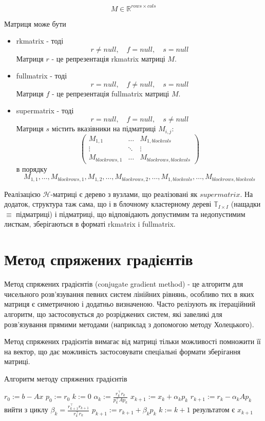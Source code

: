 \documentclass[12pt]{report}
\begin{document}
	$$M\in\mathbb{R}^{rows\times cols}$$
	\par Матриця може бути 
	\begin{itemize}
		\item rkmatrix - тоді 
		$$r\not=null,\quad
		f=null,\quad
		s=null$$
		Матриця $r$ - це репрезентація rkmatrix матриці $M$.
		\item fullmatrix - тоді  
		$$r=null,\quad
		f\not=null,\quad
		s=null$$
		Матриця $f$ - це репрезентація fullmatrix матриці $M$.
		\item supermatrix - тоді
		$$r=null,\quad
		f=null,\quad
		s\not=null$$
		Матриця $s$ містить вказівники на підматриці $M_{i,j}$:
		\[
			\begin{pmatrix}
				M_{1,1} & \dots & M_{1,blockcols}\\
				\vdots & \ddots & \vdots \\
				M_{blockrows,1} &\dots  & M_{blockrows,blockcols}
			\end{pmatrix}
		\]
		в порядку 
		$$M_{1,1},\dots,M_{blockrows,1},M_{1,2},\dots,M_{blockrows,2},\dots,M_{1,blockcols},\dots,M_{blockrows,blockcols}$$
	\end{itemize}
	\par Реалізацією $\mathcal{H}$-матриці є дерево з вузлами, що реалізовані як $supermatrix$. На додаток, структура таж сама, що і в блочному кластерному дереві $\mathbb{T}_{I\times I}$ (нащадки $\equiv$ підматриці) і підматриці, що відповідають допустимим та недопустимим листкам, зберігаються в форматі rkmatrix i fullmatrix.
	\section{Метод спряжених градієнтів}
	\par Метод спряжених градієнтів (conjugate gradient method) - це алгоритм для чисельного розв'язування певних систем лінійних рівнянь, особливо тих в яких матриця є симетричною і додатньо визначеною. Часто релізують як ітераційний алгоритм, що застосовується до розріджених систем, які завеликі для розв'язування прямими методами (наприклад з допомогою методу Холецького).
	\par Метод спряжених градієнтів вимагає від матриці тільки можливості помножити її на вектор, що дає можливість застосовувати спеціальні формати зберігання матриці.
	\begin{algorithm}
	\caption{Алгоритм методу спряжених градієнтів}
	\begin{algorithmic}
		\STATE $r_0:=b-Ax$
		\STATE $p_0:=r_0$
		\STATE $k:=0$
			\STATE $\alpha_k:=\frac{r_k^{\intercal}r_k}{p_k^{\intercal}Ap_k}$
			\STATE $x_{k+1}:=x_k+\alpha_kp_k$
			\STATE $r_{k+1}:=r_k-\alpha_kAp_k$
				\STATE вийти з циклу
			\ENDIF
			\STATE $\beta_k=\frac{r_{k+1}^{\intercal}r_{k+1}}{r_k^\intercal r_k}$
			\STATE $p_{k+1}:=r_{k+1}+\beta_kp_k$
			\STATE $k:=k+1$
		\ENDWHILE
		\STATE результатом є $x_{k+1}$
	\end{algorithmic}
	
	\end{algorithm}
\end{document}
